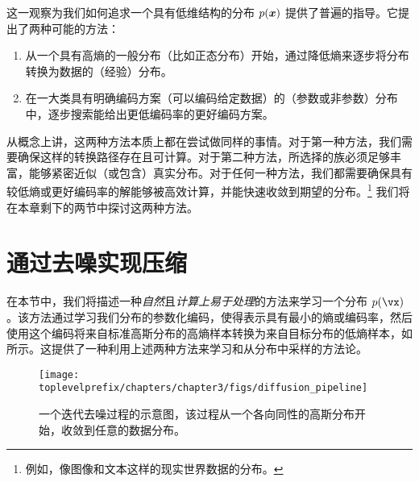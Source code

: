 \documentclass[../../book-main.tex]{subfiles}
\begin{document}
这一观察为我们如何追求一个具有低维结构的分布 $p(\bm{x})$ 提供了普遍的指导。它提出了两种可能的方法：
\begin{enumerate}
	\item 从一个具有高熵的一般分布（比如正态分布）开始，通过降低熵来逐步将分布转换为数据的（经验）分布。
	\item 在一大类具有明确编码方案（可以编码给定数据）的（参数或非参数）分布中，逐步搜索能给出更低编码率的更好编码方案。
\end{enumerate}
从概念上讲，这两种方法本质上都在尝试做同样的事情。对于第一种方法，我们需要确保这样的转换路径存在且可计算。对于第二种方法，所选择的族必须足够丰富，能够紧密近似（或包含）真实分布。对于任何一种方法，我们都需要确保具有较低熵或更好编码率的解能够被高效计算，并能快速收敛到期望的分布。\footnote{例如，像图像和文本这样的现实世界数据的分布。} 我们将在本章剩下的两节中探讨这两种方法。%

\section{通过去噪实现压缩}\label{sub:compression_denoising}

在本节中，我们将描述一种\textit{自然}且\textit{计算上易于处理}的方法来学习一个分布 \(p(\vx)\)。该方法通过学习我们分布的参数化编码，使得表示具有最小的熵或编码率，然后使用这个编码将来自标准高斯分布的高熵样本转换为来自目标分布的低熵样本，如  所示。这提供了一种利用上述两种方法来学习和从分布中采样的方法论。

\begin{figure}[t]
	\centering
	\texttt{[image: \\toplevelprefix/chapters/chapter3/figs/diffusion\_pipeline]}
	\caption{一个迭代去噪过程的示意图，该过程从一个各向同性的高斯分布开始，收敛到任意的数据分布。}
	\label{fig:diffusion-chapter3}
\end{figure}
\end{document}
